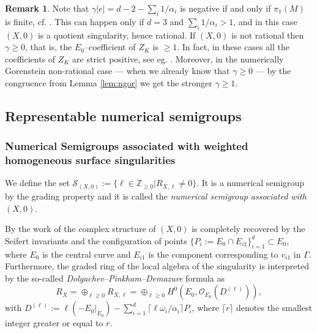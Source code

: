 \documentclass[oneside]{amsart}
\numberwithin{equation}{section}
\numberwithin{equation}{subsection}
\theoremstyle{plain}
\theoremstyle{definition}
\newtheorem{remark}[equation]{Remark}
\newcommand{\calS}{{\mathcal S}}\newcommand{\cals}{{\bf s}}\newcommand{\calst}{{\bf st}}\newcommand{\cS}{{\mathcal S}}
\begin{document}

\begin{remark}
Note that $\gamma|e|=d-2-\sum_i 1/\alpha_i$ is negative if and only if $\pi_1(M)$ is finite, cf.  \cite{CR}. This
can happen only if $d=3$ and $\sum_i1/\alpha_i>1$, and in this case $(X,0)$ is a quotient singularity,
hence rational. If $(X,0)$ is not rational then $\gamma\geq 0$, that is, the $E_0$--coefficient of $Z_K$ is
$\geq 1$. In fact, in these cases all the coefficients of $Z_K$ are strict positive, see eg. \cite[3.2.5]{stronglyflat}. Moreover, in the numerically Gorenstein non-rational case --- when we already know that $\gamma\geq 0$ --- by the congruence from Lemma \ref{lem:ngor} we get the stronger $\gamma\geq 1$.
\end{remark}



 




\subsection{Representable numerical semigroups}\label{ss:reprsem}

\subsubsection{\bf Numerical Semigroups associated with weighted homogeneous surface singularities \cite{stronglyflat}}
We define the set $\calS_{(X,0)}:=\{\ell\in\mathbb{Z}_{\geq 0} | R_{X,\ell}\neq 0\}$. It is a numerical semigroup by the grading property and it is called the {\it numerical semigroup associated with $(X,0)$}.

By  the work of \cite{art_pink} the complex structure of $(X,0)$ is completely recovered by the Seifert invariants and the configuration of points $\{P_i:=E_0\cap E_{i1}\}_{i=1}^d \subset E_0$, where  $E_0$ is the  central curve and $E_{i1}$ is the component corresponding to $v_{i1}$ in $\Gamma$. Furthermore, the graded ring of the local algebra of the singularity is interpreted by the so-called {\em Dolgachev--Pinkham--Demazure} formula as 
\begin{equation}\label{eq:DPD}
R_X=\oplus_{\ell\geq 0} R_{X,\ell}=\oplus_{\ell\geq 0}
H^0(E_0,\mathcal{O}_{E_0}(D^{(\ell)})),
\end{equation}
with $D^{(\ell)}:=\ell (-E_0|_{E_0})-\sum_{i=1}^d\lceil\ell\omega_i/\alpha_i\rceil P_i$, where $\lceil r\rceil$ denotes the smallest integer greater or equal to $r$.
\end{document}

